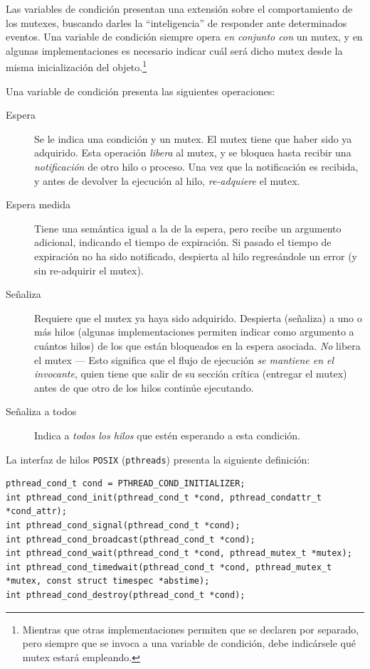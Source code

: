 \documentclass[11pt,fleqn]{book} %
\begin{document}
Las variables de condición presentan una extensión sobre el
comportamiento de los mutexes, buscando darles la ``inteligencia'' de
responder ante determinados eventos. Una variable de condición siempre
opera \emph{en conjunto con} un mutex, y en algunas implementaciones es
necesario indicar cuál será dicho mutex desde la misma inicialización
del objeto.\footnote{Mientras que otras implementaciones permiten que se
declaren por separado, pero siempre que se invoca a una variable
de condición, debe indicársele qué mutex estará empleando. }

Una variable de condición presenta las siguientes operaciones:

\begin{description}
\item[Espera] Se le indica una condición y un mutex. El mutex tiene que
            haber sido ya adquirido. Esta operación \emph{libera} al mutex,
            y se bloquea hasta recibir una \emph{notificación} de otro hilo
            o proceso. Una vez que la notificación es recibida, y
            antes de devolver la ejecución al hilo, \emph{re-adquiere} el
            mutex.
\item[Espera medida] Tiene una semántica igual a la de la espera, pero
                   recibe un argumento adicional, indicando el tiempo
                   de expiración. Si pasado el tiempo de expiración
                   no ha sido notificado, despierta al hilo
                   regresándole un error (y sin re-adquirir el
                   mutex).
\item[Señaliza] Requiere que el mutex ya haya sido adquirido. Despierta
              (señaliza) a uno o más hilos (algunas implementaciones
              permiten indicar como argumento a cuántos hilos) de los
              que están bloqueados en la espera asociada. \emph{No} libera
              el mutex — Esto significa que el flujo de ejecución \emph{se               mantiene en el invocante}, quien tiene que salir de su
              sección crítica (entregar el mutex) antes de que otro de
              los hilos continúe ejecutando.
\item[Señaliza a todos] Indica a \emph{todos los hilos} que estén esperando a
     esta condición.
\end{description}

La interfaz de hilos \texttt{POSIX} (\texttt{pthreads}) presenta la siguiente
definición:


\begin{verbatim}
pthread_cond_t cond = PTHREAD_COND_INITIALIZER;
int pthread_cond_init(pthread_cond_t *cond, pthread_condattr_t *cond_attr);
int pthread_cond_signal(pthread_cond_t *cond);
int pthread_cond_broadcast(pthread_cond_t *cond);
int pthread_cond_wait(pthread_cond_t *cond, pthread_mutex_t *mutex);
int pthread_cond_timedwait(pthread_cond_t *cond, pthread_mutex_t *mutex, const struct timespec *abstime);
int pthread_cond_destroy(pthread_cond_t *cond);
\end{verbatim}
\end{document}
